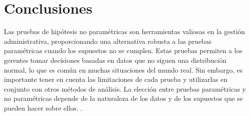 {\section{Conclusiones}
Las pruebas de hipótesis no paramétricas son herramientas valiosas en la gestión administrativa, proporcionando una alternativa robusta a las pruebas paramétricas cuando los supuestos no se cumplen. Estas pruebas permiten a los gerentes tomar decisiones basadas en datos que no siguen una distribución normal, lo que es común en muchas situaciones del mundo real. Sin embargo, es importante tener en cuenta las limitaciones de cada prueba y utilizarlas en conjunto con otros métodos de análisis. La elección entre pruebas paramétricas y no paramétricas depende de la naturaleza de los datos y de los supuestos que se pueden hacer sobre ellos. \citep{anderson2012,lind2012,wackerly2010,diazRodriguez2022}.
}

